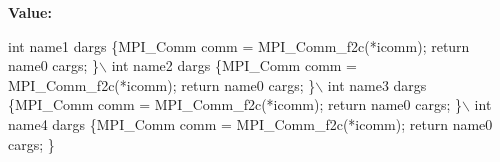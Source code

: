 {\bfseries Value\+:}
\begin{DoxyCode}
\textcolor{keywordtype}{int} name1 dargs \{MPI\_Comm comm = MPI\_Comm\_f2c(*icomm); \textcolor{keywordflow}{return} name0 cargs; \}\(\backslash\)
  int name2 dargs \{MPI\_Comm comm = MPI\_Comm\_f2c(*icomm); \textcolor{keywordflow}{return} name0 cargs; \}\(\backslash\)
  int name3 dargs \{MPI\_Comm comm = MPI\_Comm\_f2c(*icomm); \textcolor{keywordflow}{return} name0 cargs; \}\(\backslash\)
  int name4 dargs \{MPI\_Comm comm = MPI\_Comm\_f2c(*icomm); \textcolor{keywordflow}{return} name0 cargs; \}
\end{DoxyCode}
